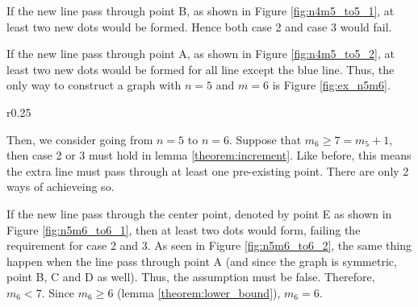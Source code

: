 \documentclass[a4paper, 12pt]{article}
\begin{document}
\begin{appendices}
If the new line pass through point B, as shown in Figure \ref{fig:n4m5_to5_1}, at least two new dots would be formed. Hence both case 2 and case 3 would fail.

If the new line pass through point A, as shown in Figure \ref{fig:n4m5_to5_2}, at least two new dots would be formed for all line except the blue line. Thus, the only way to construct a graph with $n=5$ and $m=6$ is Figure \ref{fig:ex_n5m6}.

\begin{wrapfigure}{r}{0.25\textwidth}
    \vspace{-1\baselineskip}
    
    \caption{If the extra line pass through point E.}
    \label{fig:n5m6_to6_1}
    
    \caption{If the extra line pass through point A.}
    \label{fig:n5m6_to6_2}
\end{wrapfigure}
Then, we consider going from $n=5$ to $n=6$. Suppose that $m_6\geq7=m_5+1$, then case 2 or 3 must hold in lemma \ref{theorem:increment}. Like before, this means the extra line must pass through at least one pre-existing point. There are only 2 ways of achieveing so.

If the new line pass through the center point, denoted by point E as shown in Figure \ref{fig:n5m6_to6_1}, then at least two dots would form, failing the requirement for case 2 and 3. As seen in Figure \ref{fig:n5m6_to6_2}, the same thing happen when the line pass through point A (and since the graph is symmetric, point B, C and D as well). Thus, the assumption must be false. Therefore, $m_6<7$. Since $m_6\geq6$ (lemma \ref{theorem:lower_bound}), $m_6=6$.

\null %
\end{appendices}
\end{document}
